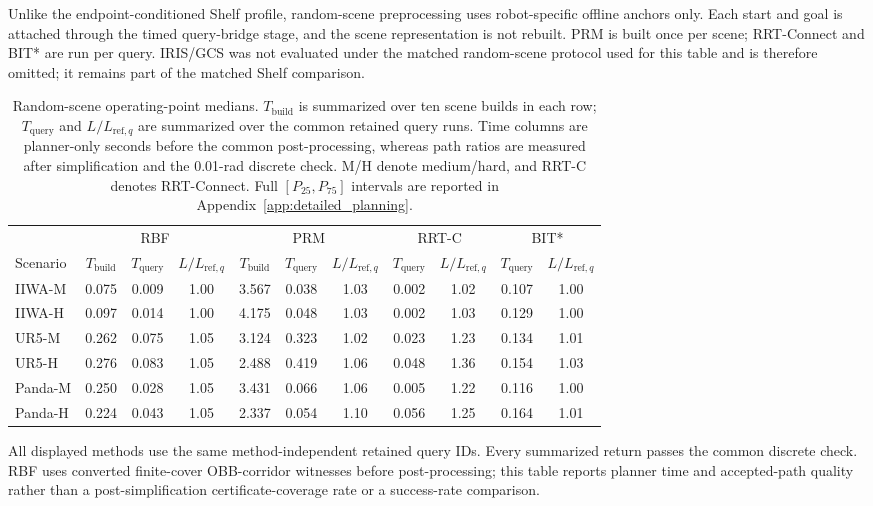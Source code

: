 \documentclass[journal]{IEEEtran}
\newcommand{\Tbuild}{\ensuremath{T_{\mathrm{build}}}}
\newcommand{\Tquery}{\ensuremath{T_{\mathrm{query}}}}
\newcommand{\Lrefq}{\ensuremath{L_{\mathrm{ref},q}}}
\begin{document}
Unlike the endpoint-conditioned Shelf profile, random-scene preprocessing uses
robot-specific offline anchors only. Each start and goal is attached through the
timed query-bridge stage, and the scene representation is not rebuilt. PRM is
built once per scene; RRT-Connect and BIT* are run per query. IRIS/GCS was not
evaluated under the matched random-scene protocol used for this table and is
therefore omitted; it remains part of the matched Shelf comparison.

\begin{table}[!t]
\centering
\caption{Random-scene operating-point medians. $\Tbuild$ is summarized over ten
scene builds in each row; $\Tquery$ and $L/\Lrefq$ are summarized over the
common retained query runs. Time columns are planner-only seconds before the
common post-processing, whereas path ratios are measured after simplification
and the 0.01-rad discrete check. M/H denote medium/hard, and RRT-C denotes
RRT-Connect. Full $[P_{25},P_{75}]$ intervals are reported in
Appendix~\ref{app:detailed_planning}.}
\label{tab:tro-random-summary}
\scriptsize
\setlength{\tabcolsep}{2.1pt}
\renewcommand{\arraystretch}{1.04}
\begin{tabular}{@{}lccc ccc cc cc@{}}
\toprule
& \multicolumn{3}{c}{RBF} & \multicolumn{3}{c}{PRM} & \multicolumn{2}{c}{RRT-C} & \multicolumn{2}{c}{BIT*} \\
\cmidrule(lr){2-4}\cmidrule(lr){5-7}\cmidrule(lr){8-9}\cmidrule(lr){10-11}
Scenario & $\Tbuild$ & $\Tquery$ & $L/\Lrefq$ & $\Tbuild$ & $\Tquery$ & $L/\Lrefq$ & $\Tquery$ & $L/\Lrefq$ & $\Tquery$ & $L/\Lrefq$ \\
\midrule
IIWA-M & 0.075 & 0.009 & 1.00 & 3.567 & 0.038 & 1.03 & 0.002 & 1.02 & 0.107 & 1.00 \\
IIWA-H & 0.097 & 0.014 & 1.00 & 4.175 & 0.048 & 1.03 & 0.002 & 1.03 & 0.129 & 1.00 \\
UR5-M & 0.262 & 0.075 & 1.05 & 3.124 & 0.323 & 1.02 & 0.023 & 1.23 & 0.134 & 1.01 \\
UR5-H & 0.276 & 0.083 & 1.05 & 2.488 & 0.419 & 1.06 & 0.048 & 1.36 & 0.154 & 1.03 \\
Panda-M & 0.250 & 0.028 & 1.05 & 3.431 & 0.066 & 1.06 & 0.005 & 1.22 & 0.116 & 1.00 \\
Panda-H & 0.224 & 0.043 & 1.05 & 2.337 & 0.054 & 1.10 & 0.056 & 1.25 & 0.164 & 1.01 \\
\bottomrule
\end{tabular}
\par\vspace{0.4ex}
{\scriptsize All displayed methods use the same method-independent
retained query IDs. Every summarized return passes the common discrete check.
RBF uses converted finite-cover OBB-corridor witnesses before post-processing;
this table reports planner time and accepted-path quality rather than a
post-simplification certificate-coverage rate or a success-rate comparison.}
\end{table}
\end{document}

